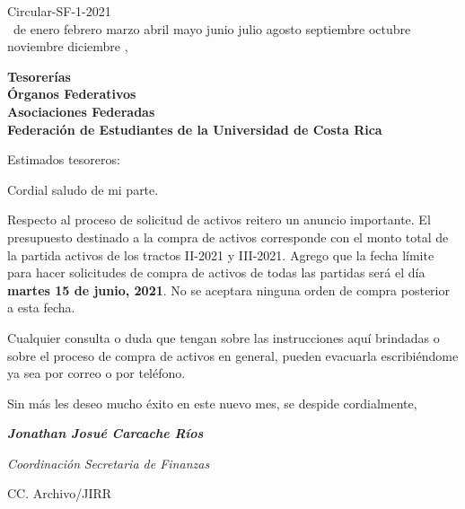 \documentclass[12pt]{article}
\newcommand{\MONTH}{%
  \ifcase\the\month
  \or enero%
  \or febrero%
  \or marzo%
  \or abril%
  \or mayo%
  \or junio%
  \or julio%
  \or agosto%
  \or septiembre%
  \or octubre%
  \or noviembre%
  \or diciembre%
  \fi}
\begin{document}
\begin{flushright}
  Circular-SF-1-2021\\
  \medskip
  \the\day\ de \MONTH, \the\year
\end{flushright}
\medskip
\begin{flushleft}\begin{spacing}{1}
  \textbf{Tesorerías\\
  Órganos Federativos\\
  Asociaciones Federadas\\
  Federación de Estudiantes de la Universidad de Costa Rica}
\end{spacing}\end{flushleft}

\noindent Estimados tesoreros:\par

Cordial saludo de mi parte.\par
Respecto al proceso de solicitud de activos reitero un anuncio importante. El presupuesto destinado a la compra de activos corresponde con el monto total de la partida activos de los tractos II-2021 y III-2021.  Agrego que la fecha límite para hacer solicitudes de compra de activos de todas las partidas será el día \textbf{martes 15 de junio, 2021}. No se aceptara ninguna orden de compra posterior a esta fecha.\par  
Cualquier consulta o duda que tengan sobre las instrucciones aquí brindadas o sobre el proceso de compra de activos en general, pueden evacuarla escribiéndome ya sea por correo o por teléfono.\par
Sin más les deseo mucho éxito en este nuevo mes, se despide cordialmente,\par
\bigskip
\bigskip
\bigskip
\begin{spacing}{1}
\textit{\textbf{Jonathan Josué Carcache Ríos}}\par
\textit{Coordinación}
\textit{Secretaria de Finanzas}
\end{spacing}
\medskip
\begin{flushleft}\begin{spacing}{1}
 \scriptsize{CC. Archivo/JIRR

 }
\end{spacing}\end{flushleft}
%
%
\end{document}
